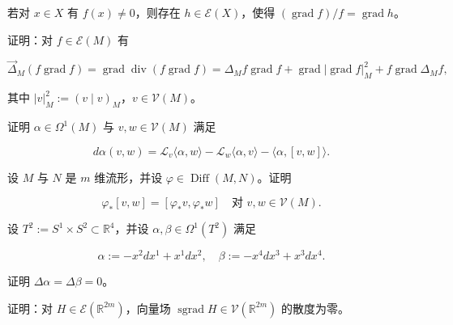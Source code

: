\begin{exercises}
\begin{subitems}
\item

若对 $ x \in X $ 有 $ f(x) \ne 0 $，则存在 $ h \in \mathcal{E}(X) $，使得 $ (\operatorname{grad}f)/f = \operatorname{grad}h $。

\end{subitems}

\item

证明：对 $ f \in \mathcal{E}(M) $ 有

\[
\vec{\Delta}_{M}(f\operatorname{grad}f) = \operatorname{grad}\operatorname{div}(f\operatorname{grad}f) = \Delta_{M}f\operatorname{grad}f + \operatorname{grad}|\operatorname{grad}f|_{M}^{2} + f\operatorname{grad}\Delta_{M}f ,
\]

其中 $ |v|_{M}^{2} := (v \mid v)_{M} $，$ v \in \mathcal{V}(M) $。

\item

证明 $ \alpha \in \Omega^{1}(M) $ 与 $ v, w \in \mathcal{V}(M) $ 满足

\[
d\alpha(v, w) = \mathcal{L}_{v}\langle \alpha, w \rangle - \mathcal{L}_{w}\langle \alpha, v \rangle - \langle \alpha, [v, w] \rangle .
\]
\item

设 $ M $ 与 $ N $ 是 $ m $ 维流形，并设 $ \varphi \in \operatorname{Diff}(M, N) $。证明

\[
\varphi_{*}[v, w] = [\varphi_{*}v, \varphi_{*}w] \quad \text{对 } v, w \in \mathcal{V}(M) .
\]
\item

设 $ T^{2} := S^{1} \times S^{2} \subset \mathbb{R}^{4} $，并设 $ \alpha, \beta \in \Omega^{1}(T^{2}) $ 满足

\[
\alpha := -x^{2}dx^{1} + x^{1}dx^{2}, \quad \beta := -x^{4}dx^{3} + x^{3}dx^{4} .
\]

证明 $ \Delta\alpha = \Delta\beta = 0 $。

\item

证明：对 $ H \in \mathcal{E}(\mathbb{R}^{2m}) $，向量场 $ \operatorname{sgrad}H \in \mathcal{V}(\mathbb{R}^{2m}) $ 的散度为零。

\end{exercises}
